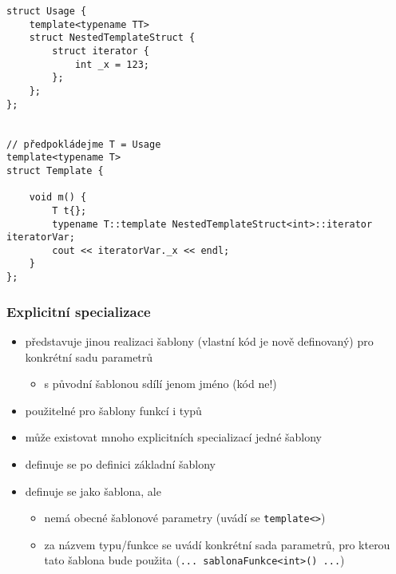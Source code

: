\begin{frame}[fragile]
\begin{yesblock}
\begin{lstlisting}[basicstyle=\scriptsize]
struct Usage {
    template<typename TT>
    struct NestedTemplateStruct {
        struct iterator {
            int _x = 123;
        };
    };
};


// předpokládejme T = Usage
template<typename T>
struct Template {
	
    void m() {
        T t{};
        typename T::template NestedTemplateStruct<int>::iterator iteratorVar;
        cout << iteratorVar._x << endl;
    }
};
\end{lstlisting}
\end{yesblock}
\end{frame}



\nezkouskove


\begin{frame}[fragile]
\frametitle{Explicitní specializace}
\begin{block}{}
\begin{itemize}
\item představuje jinou realizaci šablony (vlastní kód je nově definovaný) pro konkrétní sadu parametrů
\begin{itemize}
\item s původní šablonou sdílí jenom jméno (kód ne!)
\end{itemize}
\item použitelné pro šablony funkcí i typů
\item může existovat mnoho explicitních specializací jedné šablony
\end{itemize}
\end{block}

\begin{noteblock}{}
\begin{itemize}
\item definuje se po definici základní šablony
\item definuje se jako šablona, ale
\begin{itemize}
\item nemá obecné šablonové parametry (uvádí se \lstinline|template<>|)
\item za názvem typu/funkce se uvádí konkrétní sada parametrů, pro kterou tato šablona bude použita (\lstinline|... sablonaFunkce<int>() ...|)
\end{itemize}
\end{itemize}
\end{noteblock}
\end{frame}





